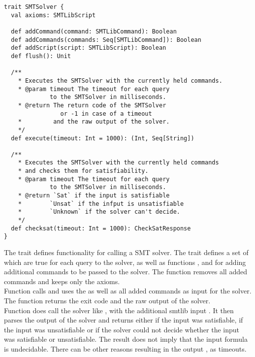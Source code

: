 %
\begin{lstlisting}[caption={SMTSolver Interface},label=lst:smtsolver,captionpos=b,frame={lines}]
trait SMTSolver {
  val axioms: SMTLibScript

  def addCommand(command: SMTLibCommand): Boolean
  def addCommands(commands: Seq[SMTLibCommand]): Boolean
  def addScript(script: SMTLibScript): Boolean
  def flush(): Unit

  /**
    * Executes the SMTSolver with the currently held commands.
    * @param timeout The timeout for each query
             to the SMTSolver in milliseconds.
    * @return The return code of the SMTSolver
                or -1 in case of a timeout
    *         and the raw output of the solver.
    */
  def execute(timeout: Int = 1000): (Int, Seq[String])

  /**
    * Executes the SMTSolver with the currently held commands
    * and checks them for satisfiability.
    * @param timeout The timeout for each query
             to the SMTSolver in milliseconds.
    * @return `Sat` if the input is satisfiable
    *        `Unsat` if the infput is unsatisfiable
    *        `Unknown` if the solver can't decide.
    */
  def checksat(timeout: Int = 1000): CheckSatResponse
}
\end{lstlisting}
%
The trait  defines
functionality for calling a SMT solver.
The trait defines a set of 
which are true for each query to the solver,
as well as functions ,
 and 
for adding additional commands to be passed to the solver.
The function  removes all added commands
and keeps only the axioms.\\
Function  calls
and uses the  as well as
all added commands as input for the solver.
The function returns the exit code
and the raw output of the solver.\\
Function  does call
the solver like , with the
additional smtlib input .
It then parses the output of the solver
and returns either
 if the input was satisfiable,
 if the input was unsatisfiable or
 if the solver could not decide
whether the input was satisfiable or unsatisfiable.
The result  does not imply
that the input formula is undecidable.
There can be other reasons resulting
in the output , as timeouts.
%
